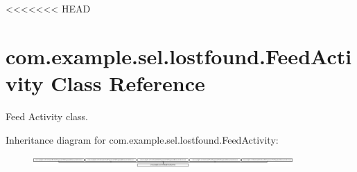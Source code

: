 <<<<<<< HEAD
\hypertarget{classcom_1_1example_1_1sel_1_1lostfound_1_1FeedActivity}{\section{com.\-example.\-sel.\-lostfound.\-Feed\-Activity Class Reference}
\label{classcom_1_1example_1_1sel_1_1lostfound_1_1FeedActivity}
}


Feed Activity class.  


Inheritance diagram for com.\-example.\-sel.\-lostfound.\-Feed\-Activity\-:\begin{figure}[H]
\begin{center}
\leavevmode
\includegraphics[height=0.347826cm]{classcom_1_1example_1_1sel_1_1lostfound_1_1FeedActivity}
\end{center}
\end{figure}
